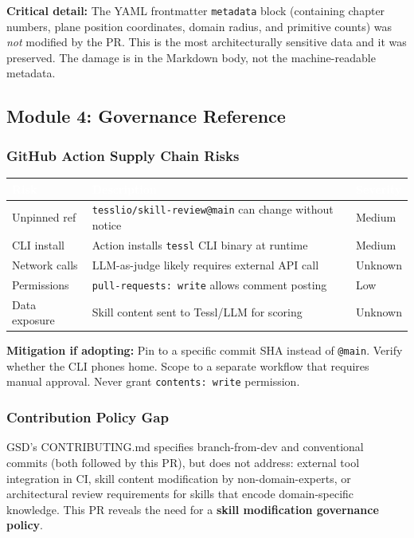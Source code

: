 \documentclass[11pt,letterpaper]{article}
\newcommand{\tableheader}[1]{\textbf{\sffamily\textcolor{white}{#1}}}
\begin{document}
\textbf{Critical detail:} The YAML frontmatter \texttt{metadata} block (containing chapter numbers, plane position coordinates, domain radius, and primitive counts) was \emph{not} modified by the PR. This is the most architecturally sensitive data and it was preserved. The damage is in the Markdown body, not the machine-readable metadata.

\subsection{Module 4: Governance Reference}

\subsubsection{GitHub Action Supply Chain Risks}

\begin{center}
\begin{tabularx}{\textwidth}{L{3cm}XL{2cm}}
\toprule
{}
\tableheader{Risk} & \tableheader{Description} & \tableheader{Severity} \\
\midrule
Unpinned ref & \texttt{tesslio/skill-review@main} can change without notice & Medium \\
CLI install & Action installs \texttt{tessl} CLI binary at runtime & Medium \\
Network calls & LLM-as-judge likely requires external API call & Unknown \\
Permissions & \texttt{pull-requests: write} allows comment posting & Low \\
Data exposure & Skill content sent to Tessl/LLM for scoring & Unknown \\
\bottomrule
\end{tabularx}
\end{center}

\textbf{Mitigation if adopting:} Pin to a specific commit SHA instead of \texttt{@main}. Verify whether the CLI phones home. Scope to a separate workflow that requires manual approval. Never grant \texttt{contents: write} permission.

\subsubsection{Contribution Policy Gap}

GSD's CONTRIBUTING.md specifies branch-from-dev and conventional commits (both followed by this PR), but does not address: external tool integration in CI, skill content modification by non-domain-experts, or architectural review requirements for skills that encode domain-specific knowledge. This PR reveals the need for a \textbf{skill modification governance policy}.
\end{document}
